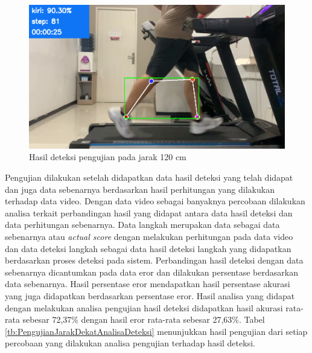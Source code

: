\begin{figure}[H]
  \centering
  \includegraphics[scale=0.42]{gambar/jarak_dekat2.png}
  \caption{Hasil deteksi pengujian pada jarak 120 cm}
  \label{fig:PengujianJarakDekat2}
\end{figure}

Pengujian dilakukan setelah didapatkan data hasil deteksi yang telah didapat dan juga data sebenarnya berdasarkan hasil perhitungan yang dilakukan terhadap data video. Dengan data video sebagai banyaknya percobaan dilakukan analisa terkait perbandingan hasil yang didapat antara data hasil deteksi dan data perhitungan sebenarnya. Data langkah merupakan data sebagai data sebenarnya atau \emph{actual score} dengan melakukan perhitungan pada data video dan data deteksi langkah sebagai data hasil deteksi langkah yang didapatkan berdasarkan proses deteksi pada sistem. Perbandingan hasil deteksi dengan data sebenarnya dicantumkan pada data eror dan dilakukan persentase berdasarkan data sebenarnya. Hasil persentase eror mendapatkan hasil persentase akurasi yang juga didapatkan berdasarkan persentase eror. Hasil analisa yang didapat dengan melakukan analisa pengujian hasil deteksi didapatkan hasil akurasi rata-rata sebesar 72,37\% dengan hasil eror rata-rata sebesar 27,63\%. Tabel \ref{tb:PengujianJarakDekatAnalisaDeteksi} menunjukkan hasil pengujian dari setiap percobaan yang dilakukan analisa pengujian terhadap hasil deteksi.

